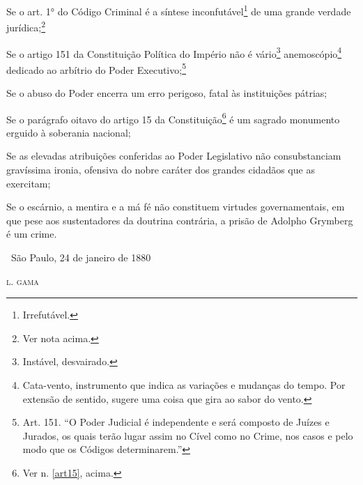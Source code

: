 \asterisc

Se o art. 1° do Código Criminal é a síntese inconfutável\footnote{
  Irrefutável.} de uma grande verdade jurídica;\footnote{Ver nota
  acima.} %

Se o artigo 151 da Constituição Política do Império não é
vário\footnote{Instável, desvairado.} anemoscópio\footnote{
  Cata-vento, instrumento que indica as variações e mudanças do tempo.
  Por extensão de sentido, sugere uma coisa que gira ao sabor do vento.}
dedicado ao arbítrio do Poder Executivo;\footnote{Art. 151. ``O Poder
  Judicial é independente e será composto de Juízes e Jurados, os
  quais terão lugar assim no Cível como no Crime, nos casos e pelo modo
  que os Códigos determinarem.''}

Se o abuso do Poder encerra um erro perigoso, fatal às instituições
pátrias; %

Se o parágrafo oitavo do artigo 15 da Constituição\footnote{Ver n. \ref{art15}, acima.} é um sagrado
monumento erguido à soberania nacional;

Se as elevadas atribuições conferidas ao Poder Legislativo não
consubstanciam gravíssima ironia, ofensiva do nobre caráter dos grandes
cidadãos que as exercitam;

Se o escárnio, a mentira e a má fé não constituem virtudes
governamentais, em que pese aos sustentadores da doutrina contrária, a
prisão de Adolpho Grymberg é um crime.\medskip

\hfill\ São Paulo, 24 de janeiro de 1880

\hfill\textsc{l. gama}


